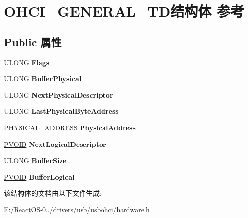 \hypertarget{struct_o_h_c_i___g_e_n_e_r_a_l___t_d}{}\section{O\+H\+C\+I\+\_\+\+G\+E\+N\+E\+R\+A\+L\+\_\+\+T\+D结构体 参考}
\label{struct_o_h_c_i___g_e_n_e_r_a_l___t_d}
\subsection*{Public 属性}
\begin{DoxyCompactItemize}
\item 
\mbox{\label{struct_o_h_c_i___g_e_n_e_r_a_l___t_d_a1f3731f908d887cbd7685975452f15de}} 
U\+L\+O\+NG {\bfseries Flags}
\item 
\mbox{\label{struct_o_h_c_i___g_e_n_e_r_a_l___t_d_a15ae08ed169c42dd69ff3b2a9c0af174}} 
U\+L\+O\+NG {\bfseries Buffer\+Physical}
\item 
\mbox{\label{struct_o_h_c_i___g_e_n_e_r_a_l___t_d_a1a9d3125e318416c2ab3682f716551e9}} 
U\+L\+O\+NG {\bfseries Next\+Physical\+Descriptor}
\item 
\mbox{\label{struct_o_h_c_i___g_e_n_e_r_a_l___t_d_a1c4305c61f6eb1cefe6e27aeff45a405}} 
U\+L\+O\+NG {\bfseries Last\+Physical\+Byte\+Address}
\item 
\mbox{\label{struct_o_h_c_i___g_e_n_e_r_a_l___t_d_ada963d4bb5e7e694c8f72b0102f57797}} 
\hyperlink{union___l_a_r_g_e___i_n_t_e_g_e_r}{P\+H\+Y\+S\+I\+C\+A\+L\+\_\+\+A\+D\+D\+R\+E\+SS} {\bfseries Physical\+Address}
\item 
\mbox{\label{struct_o_h_c_i___g_e_n_e_r_a_l___t_d_a9d1361c16e69ae5bd6837c4fc6ad247d}} 
\hyperlink{interfacevoid}{P\+V\+O\+ID} {\bfseries Next\+Logical\+Descriptor}
\item 
\mbox{\label{struct_o_h_c_i___g_e_n_e_r_a_l___t_d_a491f5ae60b173235c64d5c8af3943064}} 
U\+L\+O\+NG {\bfseries Buffer\+Size}
\item 
\mbox{\label{struct_o_h_c_i___g_e_n_e_r_a_l___t_d_afe03081306c1c25af1d8f18e8c3b2d40}} 
\hyperlink{interfacevoid}{P\+V\+O\+ID} {\bfseries Buffer\+Logical}
\end{DoxyCompactItemize}


该结构体的文档由以下文件生成\+:\begin{DoxyCompactItemize}
\item 
E\+:/\+React\+O\+S-\/0../drivers/usb/usbohci/hardware.\+h\end{DoxyCompactItemize}

